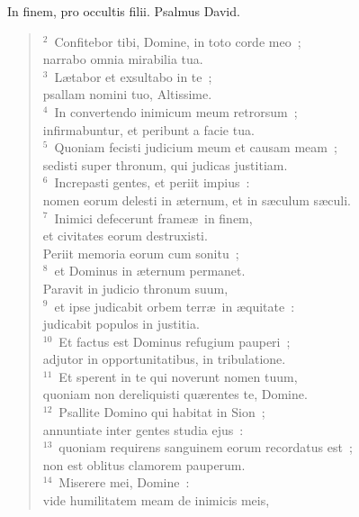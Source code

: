 \lettrine[lines=3,image=true,loversize=0.05,lraise=-0.03]{I}{}n finem, pro occultis filii. Psalmus David.
\begin{flushleft}\begin{verse}\vspace{6pt}${}^{2}$~Confitebor tibi, Domine, in toto corde meo~;\\ narrabo omnia mirabilia tua.\\
${}^{3}$~L\ae tabor et exsultabo in te~;\\ psallam nomini tuo, Altissime.\\
${}^{4}$~In convertendo inimicum meum retrorsum~;\\ infirmabuntur, et peribunt a facie tua.\\
${}^{5}$~Quoniam fecisti judicium meum et causam meam~;\\ sedisti super thronum, qui judicas justitiam.\\
${}^{6}$~Increpasti gentes, et periit impius~:\\ nomen eorum delesti in \ae ternum, et in s\ae culum s\ae culi.\\
${}^{7}$~Inimici defecerunt frame\ae\ in finem,\\ et civitates eorum destruxisti.\\ Periit memoria eorum cum sonitu~;\\
${}^{8}$~et Dominus in \ae ternum permanet.\\ Paravit in judicio thronum suum,\\
${}^{9}$~et ipse judicabit orbem terr\ae\ in \ae quitate~:\\ judicabit populos in justitia.\\
${}^{10}$~Et factus est Dominus refugium pauperi~;\\ adjutor in opportunitatibus, in tribulatione.\\
${}^{11}$~Et sperent in te qui noverunt nomen tuum,\\ quoniam non dereliquisti qu\ae rentes te, Domine.\\
${}^{12}$~Psallite Domino qui habitat in Sion~;\\ annuntiate inter gentes studia ejus~:\\
${}^{13}$~quoniam requirens sanguinem eorum recordatus est~;\\ non est oblitus clamorem pauperum.\\
${}^{14}$~Miserere mei, Domine~:\\ vide humilitatem meam de inimicis meis,\\

\end{verse}
\end{flushleft}
